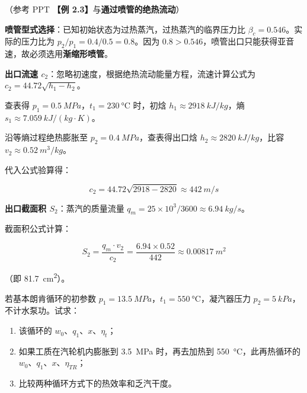 \begin{solution}
（参考 PPT \textbf{【例 2.3】}与\textbf{通过喷管的绝热流动}）

\textbf{喷管型式选择}：已知初始状态为过热蒸汽，过热蒸汽的临界压力比 \(\beta_c = 0.546\)。实际的压力比为 \(p_2/p_1 = 0.4 / 0.5 = 0.8\)。因为 \(0.8 > 0.546\)，喷管出口只能获得亚音速，故必须选用\textbf{渐缩形喷管}。

\textbf{出口流速 \(c_2\)}：忽略初速度，根据绝热流动能量方程，流速计算公式为 \(c_2 = 44.72\sqrt{h_1 - h_2}\)。

查表得 \(p_1 = \qty{0.5}{MPa}\)，\(t_1 = \qty{230}{\degreeCelsius}\) 时，初焓 \(h_1 \approx \qty{2918}{kJ/kg}\)，熵 \(s_1 \approx \qty{7.059}{kJ/(kg\cdot K)}\)。

沿等熵过程绝热膨胀至 \(p_2 = \qty{0.4}{MPa}\)，查表得出口焓 \(h_2 \approx \qty{2820}{kJ/kg}\)，比容 \(v_2 \approx \qty{0.52}{m^3/kg}\)。

代入公式验算得：

\begin{equation*}
  c_2 = 44.72\sqrt{2918 - 2820} \approx \qty{442}{m/s}
\end{equation*}

\textbf{出口截面积 \(S_2\)}：蒸汽的质量流量 \(q_m = 25 \times 10^3 / 3600 \approx \qty{6.94}{kg/s}\)。

截面积公式计算：

  \begin{equation*}
  S_2 = \frac{q_m \cdot v_2}{c_2} = \frac{6.94 \times 0.52}{442} \approx \qty{0.00817}{m^2}
\end{equation*}

（即 \qty{81.7}{cm^2}）。

\end{solution}

\begin{problem}
若基本朗肯循环的初参数 \(p_1 = \qty{13.5}{MPa}\)，\(t_1 = \qty{550}{\degreeCelsius}\)，凝汽器压力 \(p_2 = \qty{5}{kPa}\)，不计水泵功。试求：
\begin{enumerate}
  \item 该循环的 \(w_0\)、\(q_1\)、\(x\)、\(\eta_t\)；
  \item 如果工质在汽轮机内膨胀到 \qty{3.5}{MPa} 时，再去加热到 \qty{550}{\degreeCelsius}，此再热循环的 \(w_0\)、\(q_1\)、\(x\)、\(\eta_{TR}\)；
  \item 比较两种循环方式下的热效率和乏汽干度。
\end{enumerate}
\end{problem}

